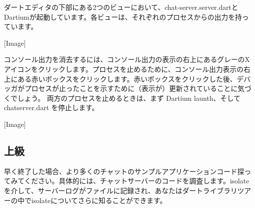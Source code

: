 ダートエディタの下部にある2つのビューにおいて、chat-server.server.dartとDartiumが起動しています。各ビューは、それぞれのプロセスからの出力を持っています。

[Image]

コンソール出力を消去するには、コンソール出力の表示の右上にあるグレーのXアイコンをクリックします。プロセスを止めるために、コンソール出力表示の右上にある赤いボックスをクリックします。赤いボックスをクリックした後、デバッガがプロセスが止ったことを示すために（表示が）更新されていることに気づくでしょう。
両方のプロセスを止めるときは、まず Dartium launth、そして chatserver.dart を停止します。

[Image]

\subsection{上級}

早く終了した場合、より多くのチャットのサンプルアプリケーションコード探ってみてください。具体的には、チャットサーバーのコードを調査します。isolateを介して、サーバーログがファイルに記録され、あなたはダートライブラリツアーの中でisolateについてさらに知ることができます。
